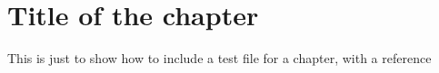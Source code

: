 \chapter{Title of the chapter}
This is just to show how to include a test file for a chapter, with a reference \cite{ledesma_scree_2015}